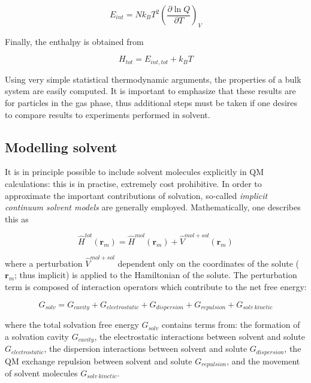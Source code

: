 \begin{equation}
  E_{int} = Nk_B T^2\left( \frac{\partial \ln Q}{\partial T} \right)_V
\end{equation}

\noindent Finally, the enthalpy is obtained from

\begin{equation}
  H_{tot} = E_{int,tot} + k_B T
\end{equation}

Using very simple statistical thermodynamic arguments, the properties of a bulk
system are easily computed. It is important to emphasize that these results are
for particles in the gas phase, thus additional steps must be taken if one
desires to compare results to experiments performed in solvent.

\subsection{Modelling solvent}

It is in principle possible to include solvent molecules explicitly in QM
calculations: this is in practise, extremely cost prohibitive. In order to
approximate the important contributions of solvation, so-called \emph{implicit
continuum solvent models} are generally employed.\cite{Mennucci2007,Cramer2004}
Mathematically, one describes this as

\begin{equation}
  \hat{H}^{tot}(\mathbf{r}_m) = \hat{H}^{mol}(\mathbf{r}_m) + \hat{V}^{mol+sol}(\mathbf{r}_m)
\end{equation}

\noindent where a perturbation $\hat{V}^{mol+sol}$ dependent only on the
coordinates of the solute ($\mathbf{r}_m$; thus implicit) is applied to the
Hamiltonian of the solute. The perturbation term is composed of interaction
operators which contribute to the net free energy:

\begin{equation}
G_{solv} = G_{cavity} + G_{electrostatic} + G_{dispersion} + G_{repulsion} +
G_{solv~kinetic}
\end{equation}

\noindent where the total solvation free energy $G_{solv}$ contains terms from:
the formation of a solvation cavity $G_{cavity}$, the electrostatic
interactions between solvent and solute $G_{electrostatic}$, the dispersion
interactions between solvent and solute $G_{dispersion}$, the QM exchange
repulsion between solvent and solute $G_{repulsion}$, and the movement of
solvent molecules $G_{solv~kinetic}$.

